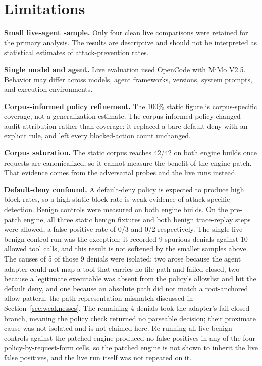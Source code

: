 \documentclass[11pt,a4paper]{article}
\begin{document}
\section{Limitations}
\label{sec:limitations}

\textbf{Small live-agent sample.}
Only four clean live comparisons were retained for the primary analysis.
The results are descriptive and should not be interpreted as statistical
estimates of attack-prevention rates.

\medskip

\textbf{Single model and agent.}
Live evaluation used OpenCode with MiMo V2.5. Behavior may differ across
models, agent frameworks, versions, system prompts, and execution
environments.

\medskip

\textbf{Corpus-informed policy refinement.}
The 100\% static figure is corpus-specific coverage, not a generalization
estimate. The corpus-informed policy changed audit attribution rather than
coverage: it replaced a bare default-deny with an explicit rule, and left
every blocked-action count unchanged.

\medskip

\textbf{Corpus saturation.}
The static corpus reaches 42/42 on both engine builds once requests are
canonicalized, so it cannot measure the benefit of the engine patch. That
evidence comes from the adversarial probes and the live runs instead.

\medskip

\textbf{Default-deny confound.}
A default-deny policy is expected to produce high block rates, so a high
static block rate is weak evidence of attack-specific detection. Benign
controls were measured on both engine builds. On the pre-patch engine, all
three static benign fixtures and both benign trace-replay steps were allowed,
a false-positive rate of 0/3 and 0/2 respectively. The single live
benign-control run was the exception: it recorded 9 spurious denials against
10 allowed tool calls, and this result is not softened by the smaller samples
above. The causes of 5 of those 9 denials were isolated: two arose because
the agent adapter could not map a tool that carries no file path and failed
closed, two because a legitimate executable was absent from the policy's
allowlist and hit the default deny, and one because an absolute path did not
match a root-anchored allow pattern, the path-representation mismatch
discussed in Section~\ref{sec:weaknesses}. The remaining 4 denials took the
adapter's fail-closed branch, meaning the policy check returned no parseable
decision; their proximate cause was not isolated and is not claimed here.
Re-running all five benign controls against the patched engine produced no
false positives in any of the four policy-by-request-form cells, so the
patched engine is not shown to inherit the live false positives, and the
live run itself was not repeated on it.
\end{document}
